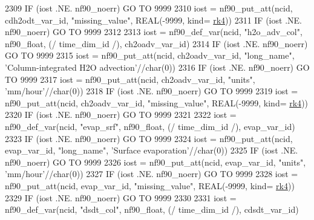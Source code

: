 \begin{DoxyCode}
{{{{{{2309     \textcolor{keywordflow}{IF} (iost .NE. nf90\_noerr) \textcolor{keywordflow}{GO TO} 9999
2310     iost    = nf90\_put\_att(ncid, cdh2odt\_var\_id, \textcolor{stringliteral}{"missing\_value"}, \textcolor{keywordtype}{REAL}(-9999, kind=
      \hyperlink{namespaceportable_abaed22a509442771d3fba69bebda0b33}{rk4}))
2311     \textcolor{keywordflow}{IF} (iost .NE. nf90\_noerr) \textcolor{keywordflow}{GO TO} 9999
2312 
2313     iost    = nf90\_def\_var(ncid, \textcolor{stringliteral}{"h2o\_adv\_col"}, nf90\_float, (/ time\_dim\_id /), ch2oadv\_var\_id)
2314     \textcolor{keywordflow}{IF} (iost .NE. nf90\_noerr) \textcolor{keywordflow}{GO TO} 9999
2315     iost    = nf90\_put\_att(ncid, ch2oadv\_var\_id, \textcolor{stringliteral}{"long\_name"}, \textcolor{stringliteral}{'Column-integrated H2O advection'}//char(0))
2316     \textcolor{keywordflow}{IF} (iost .NE. nf90\_noerr) \textcolor{keywordflow}{GO TO} 9999
2317     iost    = nf90\_put\_att(ncid, ch2oadv\_var\_id, \textcolor{stringliteral}{"units"}, \textcolor{stringliteral}{'mm/hour'}//char(0))
2318     \textcolor{keywordflow}{IF} (iost .NE. nf90\_noerr) \textcolor{keywordflow}{GO TO} 9999
2319     iost    = nf90\_put\_att(ncid, ch2oadv\_var\_id, \textcolor{stringliteral}{"missing\_value"}, \textcolor{keywordtype}{REAL}(-9999, kind=
      \hyperlink{namespaceportable_abaed22a509442771d3fba69bebda0b33}{rk4}))
2320     \textcolor{keywordflow}{IF} (iost .NE. nf90\_noerr) \textcolor{keywordflow}{GO TO} 9999
2321 
2322     iost    = nf90\_def\_var(ncid, \textcolor{stringliteral}{"evap\_srf"}, nf90\_float, (/ time\_dim\_id /), evap\_var\_id)
2323     \textcolor{keywordflow}{IF} (iost .NE. nf90\_noerr) \textcolor{keywordflow}{GO TO} 9999
2324     iost    = nf90\_put\_att(ncid, evap\_var\_id, \textcolor{stringliteral}{"long\_name"}, \textcolor{stringliteral}{'Surface evaporation'}//char(0))
2325     \textcolor{keywordflow}{IF} (iost .NE. nf90\_noerr) \textcolor{keywordflow}{GO TO} 9999
2326     iost    = nf90\_put\_att(ncid, evap\_var\_id, \textcolor{stringliteral}{"units"}, \textcolor{stringliteral}{'mm/hour'}//char(0))
2327     \textcolor{keywordflow}{IF} (iost .NE. nf90\_noerr) \textcolor{keywordflow}{GO TO} 9999
2328     iost    = nf90\_put\_att(ncid, evap\_var\_id, \textcolor{stringliteral}{"missing\_value"}, \textcolor{keywordtype}{REAL}(-9999, kind=
      \hyperlink{namespaceportable_abaed22a509442771d3fba69bebda0b33}{rk4}))
2329     \textcolor{keywordflow}{IF} (iost .NE. nf90\_noerr) \textcolor{keywordflow}{GO TO} 9999
2330 
2331     iost    = nf90\_def\_var(ncid, \textcolor{stringliteral}{"dsdt\_col"}, nf90\_float, (/ time\_dim\_id /), cdsdt\_var\_id)
}}}}}}
\end{DoxyCode}
